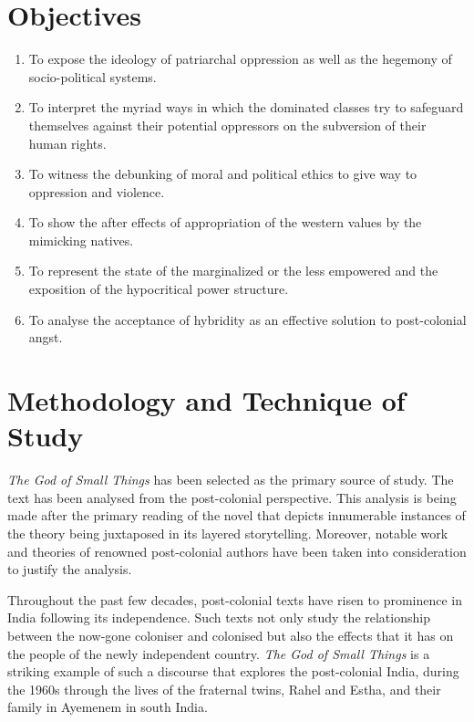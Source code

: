 \section{Objectives}

\begin{enumerate}
  \item To expose the ideology of patriarchal oppression as well as the hegemony of socio-political systems.
  \item To interpret the myriad ways in which the dominated classes try to safeguard themselves against their potential oppressors on the subversion of their human rights.
  \item To witness the debunking of moral and political ethics to give way to oppression and violence.
  \item To show the after effects of appropriation of the western values by the mimicking natives.
  \item To represent the state of the marginalized or the less empowered and the exposition of the hypocritical power structure.
  \item To analyse the acceptance of hybridity as an effective solution to post-colonial angst.
\end{enumerate}


\section{Methodology and Technique of Study}

\emph{The God of Small Things} has been selected as the primary source of study. The text has been analysed from the post-colonial perspective. This analysis is being made after the primary reading of the novel that depicts innumerable instances of the theory being juxtaposed in its layered storytelling. Moreover, notable work and theories of renowned post-colonial authors have been taken into consideration to justify the analysis.

Throughout the past few decades, post-colonial texts have risen to prominence in India following its independence. Such texts not only study the relationship between the now-gone coloniser and colonised but also the effects that it has on the people of the newly independent country. \emph{The God of Small Things} is a striking example of such a discourse that explores the post-colonial India, during the 1960s through the lives of the fraternal twins, Rahel and Estha, and their family in Ayemenem in south India.

